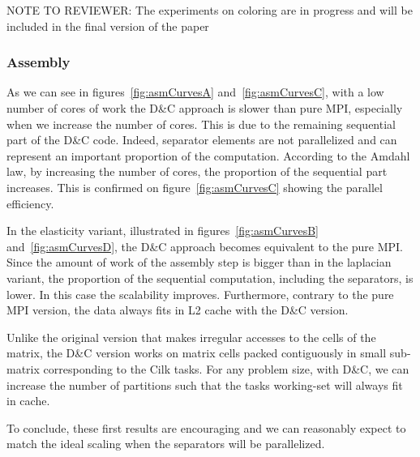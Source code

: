 \documentclass{IOS-Book-Article}
\begin{document}
NOTE TO REVIEWER: The experiments on coloring are in progress and will be included in the final version of the paper

\subsubsection{Assembly}
As we can see in figures~\ref{fig:asmCurvesA} and~\ref{fig:asmCurvesC}, with a low number of cores of work the D\&C approach is slower than pure MPI, especially when we increase
the number of cores.
This is due to the remaining sequential part of the D\&C code.
Indeed, separator elements are not parallelized and can represent an important proportion of the computation.
According to the Amdahl law, by increasing the number of cores, the proportion of the sequential part increases. This is confirmed on figure~\ref{fig:asmCurvesC} showing the parallel efficiency.

In the elasticity variant, illustrated in figures~\ref{fig:asmCurvesB} and~\ref{fig:asmCurvesD}, the D\&C approach becomes equivalent to the pure MPI.
Since the amount of work of the assembly step is bigger than in the laplacian variant, the proportion of the sequential computation, including the separators, is lower. In this case the scalability improves. Furthermore, contrary to the pure MPI version, the data always fits in L2 cache with the D\&C version.

Unlike the original version that makes irregular accesses to the cells of the matrix, the D\&C version works on matrix cells packed contiguously in small sub-matrix corresponding to the Cilk tasks.
For any problem size, with D\&C, we can increase the number of partitions such that the tasks working-set will always fit in cache.

To conclude, these first results are encouraging and we can reasonably expect to match the ideal scaling when the separators will be parallelized.
\end{document}
